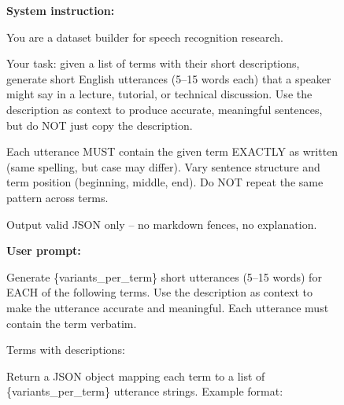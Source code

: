 \begin{figure}[t] %
\begin{tcolorbox}[
    enhanced,
    colback=gray!3,
    colframe=gray!55!black,
    title={Prompt template for Wikidata term utterance generation},
    fonttitle=\bfseries,
    boxrule=0.4pt,
    arc=1mm,
    left=1.5mm,
    right=1.5mm,
    top=1mm,
    bottom=1mm,
    width=\textwidth %
]
{\ttfamily\footnotesize
\textbf{System instruction:}\par
You are a dataset builder for speech recognition research.\par
Your task: given a list of terms with their short descriptions, generate short English utterances (5--15 words each) that a speaker might say in a lecture, tutorial, or technical discussion. Use the description as context to produce accurate, meaningful sentences, but do NOT just copy the description.\par
Each utterance MUST contain the given term EXACTLY as written (same spelling, but case may differ). Vary sentence structure and term position (beginning, middle, end). Do NOT repeat the same pattern across terms.\par
Output valid JSON only -- no markdown fences, no explanation.\par
\vspace{0.5em}
\textbf{User prompt:}\par
Generate \{variants\_per\_term\} short utterances (5--15 words) for EACH of the following terms. Use the description as context to make the utterance accurate and meaningful. Each utterance must contain the term verbatim.\par
\vspace{0.5em}
Terms with descriptions:\par
[\par
\hspace*{1em}\{"term": "Seismology", "description": "scientific study of earthquakes"\},\par
\hspace*{1em}\{"term": "dataflow graph", "description": "graph representation of data dependencies"\}\par
]\par
\vspace{0.5em}
Return a JSON object mapping each term to a list of \{variants\_per\_term\} utterance strings. Example format:\par
}
\end{tcolorbox}
\end{figure}
